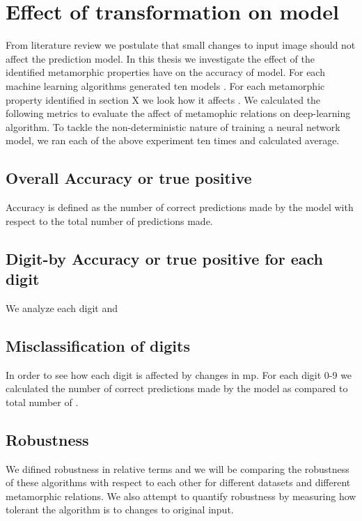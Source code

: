 \section{Effect of transformation on model}
From literature review we postulate that small changes to input image should not affect the prediction model. In this thesis we investigate the effect of the identified metamorphic properties have on the accuracy of model. For each machine learning algorithms generated ten models . For each metamorphic property identified in section X we look how it affects . We calculated the following metrics to evaluate the affect of metamophic relations on deep-learning algorithm. To tackle the non-deterministic nature of training a neural network model, we ran each of the above experiment ten times and calculated average.
\subsection{Overall Accuracy or true positive}
    Accuracy is defined as the number of correct predictions made by the model with respect to the total number of predictions made.
\subsection{Digit-by Accuracy or true positive for each digit}
    We analyze each digit and 
\subsection{Misclassification of digits}
    In order to see how each digit is affected by changes in  mp. For each digit 0-9 we calculated the number of correct predictions made by the model as compared to total number of .
\subsection{Robustness}
We difined robustness in relative terms and we will be comparing the robustness of these algorithms with respect to each other for different datasets and different metamorphic relations. We also attempt to quantify robustness by measuring how tolerant the algorithm is to changes to original input.
    
\clearpage
% 

